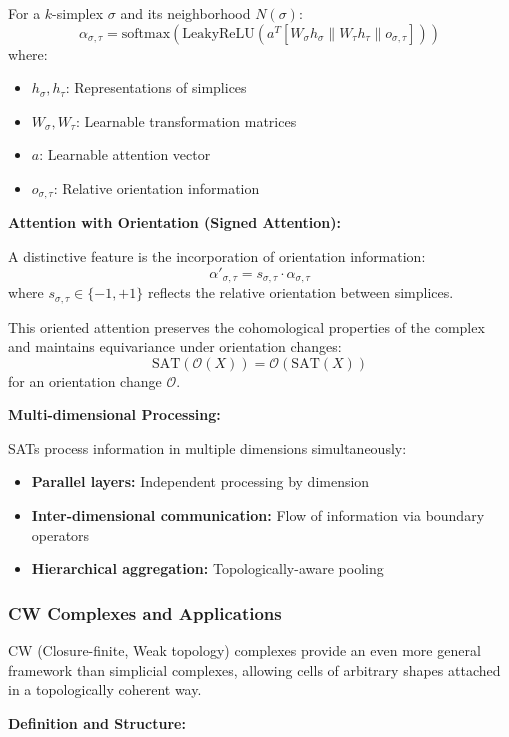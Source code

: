 For a $k$-simplex $\sigma$ and its neighborhood $N(\sigma)$:
\[\alpha_{\sigma,\tau} = \text{softmax}\left(\text{LeakyReLU}\left(a^T[W_\sigma h_\sigma \| W_\tau h_\tau \| o_{\sigma,\tau}]\right)\right)\]
where:
\begin{itemize}
    \item $h_\sigma, h_\tau$: Representations of simplices
    \item $W_\sigma, W_\tau$: Learnable transformation matrices
    \item $a$: Learnable attention vector
    \item $o_{\sigma,\tau}$: Relative orientation information
\end{itemize}

\textbf{Attention with Orientation (Signed Attention):}

A distinctive feature is the incorporation of orientation information:
\[\alpha'_{\sigma,\tau} = s_{\sigma,\tau} \cdot \alpha_{\sigma,\tau}\]
where $s_{\sigma,\tau} \in \{-1, +1\}$ reflects the relative orientation between simplices.

This oriented attention preserves the cohomological properties of the complex and maintains equivariance under orientation changes:
\[\text{SAT}(\mathcal{O}(X)) = \mathcal{O}(\text{SAT}(X))\]
for an orientation change $\mathcal{O}$.

\textbf{Multi-dimensional Processing:}

SATs process information in multiple dimensions simultaneously:
\begin{itemize}
    \item \textbf{Parallel layers:} Independent processing by dimension
    \item \textbf{Inter-dimensional communication:} Flow of information via boundary operators
    \item \textbf{Hierarchical aggregation:} Topologically-aware pooling
\end{itemize}

\subsubsection{CW Complexes and Applications}

CW (Closure-finite, Weak topology) complexes provide an even more general framework than simplicial complexes, allowing cells of arbitrary shapes attached in a topologically coherent way.

\textbf{Definition and Structure:}

